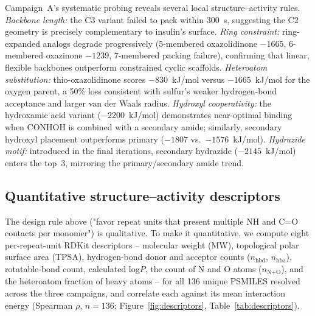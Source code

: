 \documentclass[twocolumn]{fairmeta}
\begin{document}
Campaign~A's systematic probing reveals several local structure--activity rules.
\emph{Backbone length:} the C3 variant failed to pack within 300~s, suggesting the C2 geometry is precisely complementary to insulin's surface.
\emph{Ring constraint:} ring-expanded analogs degrade progressively (5-membered oxazolidinone $-1665$, 6-membered oxazinone $-1239$, 7-membered packing failure), confirming that linear, flexible backbones outperform constrained cyclic scaffolds.
\emph{Heteroatom substitution:} thio-oxazolidinone scores $-830$~kJ/mol versus $-1665$~kJ/mol for the oxygen parent, a 50\% loss consistent with sulfur's weaker hydrogen-bond acceptance and larger van der Waals radius.
\emph{Hydroxyl cooperativity:} the hydroxamic acid variant ($-2200$~kJ/mol) demonstrates near-optimal binding when CONHOH is combined with a secondary amide; similarly, secondary hydroxyl placement outperforms primary ($-1807$ vs.\ $-1576$~kJ/mol).
\emph{Hydrazide motif:} introduced in the final iterations, secondary hydrazide ($-2145$~kJ/mol) enters the top~3, mirroring the primary/secondary amide trend.

\subsection{Quantitative structure--activity descriptors}
\label{sec:descriptors}

The design rule above ("favor repeat units that present multiple NH and C{=}O contacts per monomer") is qualitative.
To make it quantitative, we compute eight per-repeat-unit RDKit descriptors -- molecular weight (MW), topological polar surface area (TPSA), hydrogen-bond donor and acceptor counts ($n_\text{hbd}$, $n_\text{hba}$), rotatable-bond count, calculated log$P$, the count of N and O atoms ($n_{\text{N+O}}$), and the heteroatom fraction of heavy atoms -- for all 136 unique PSMILES resolved across the three campaigns, and correlate each against its mean interaction energy (Spearman $\rho$, $n{=}136$; Figure~\ref{fig:descriptors}, Table~\ref{tab:descriptors}).
\end{document}

